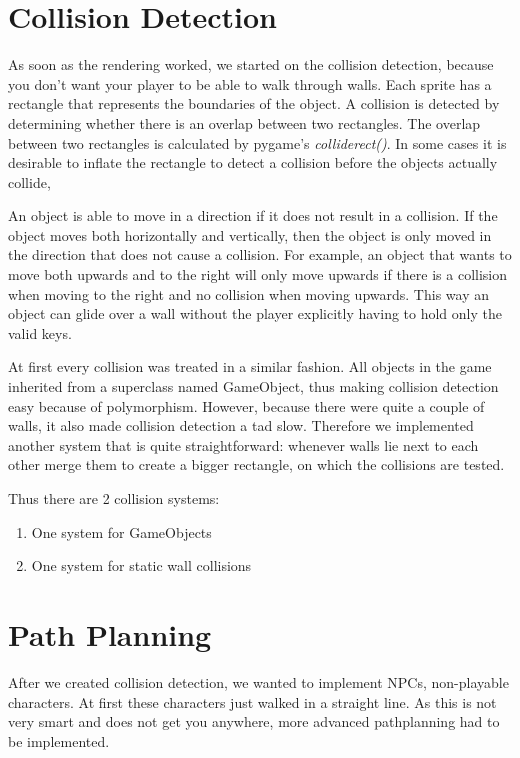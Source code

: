 \documentclass[a4paper,pdf,12pt]{article}
\begin{document}
\section{Collision Detection}
\label{sec:Collision Detection}
As soon as the rendering worked, we started on the collision detection, because you don't want your player to be able to walk through walls. Each sprite has a rectangle that represents the boundaries of the object. A collision is detected by determining whether there is an overlap between two rectangles. The overlap between two rectangles is calculated by pygame's \textit{colliderect()}. In some cases it is desirable to inflate the rectangle to detect a collision before the objects actually collide,

An object is able to move in a direction if it does not result in a collision. If the object moves both horizontally and vertically, then the object is only moved in the direction that does not cause a collision. For example, an object that wants to move both upwards and to the right will only move upwards if there is a collision when moving to the right and no collision when moving upwards. This way an object can glide over a wall without the player explicitly having to hold only the valid keys. 

At first every collision was treated in a similar fashion. All objects in the game inherited from a superclass named GameObject, thus making collision detection easy because of polymorphism. However, because there were quite a couple of walls, it also made collision detection a tad slow. Therefore we implemented another system that is quite straightforward: whenever walls lie next to each other merge them to create a bigger rectangle, on which the collisions are tested.

Thus there are 2 collision systems:
\begin{enumerate}
\item One system for GameObjects
\item One system for static wall collisions
\end{enumerate}

\section{Path Planning}
\label{sec:Path Planning}

After we created collision detection, we wanted to implement NPCs, non-playable characters. At first these characters just walked in a straight line. As this is not very smart and does not get you anywhere, more advanced pathplanning had to be implemented. 
\end{document}
